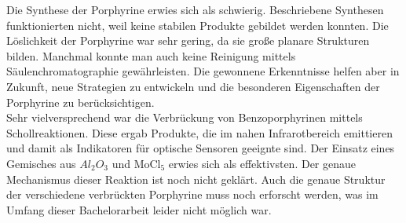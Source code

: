 Die Synthese der Porphyrine erwies sich als schwierig. Beschriebene Synthesen funktionierten nicht, weil keine stabilen Produkte gebildet werden konnten. Die Löslichkeit der Porphyrine war sehr gering, da sie große planare Strukturen bilden. Manchmal konnte man auch keine Reinigung mittels Säulenchromatographie gewährleisten.
Die gewonnene Erkenntnisse helfen aber in Zukunft, neue Strategien zu entwickeln und die besonderen Eigenschaften der Porphyrine zu berücksichtigen.
\\Sehr vielversprechend war die Verbrückung von Benzoporphyrinen mittels Schollreaktionen. Diese ergab Produkte, die im nahen Infrarotbereich emittieren und damit als Indikatoren für optische Sensoren geeignte sind. Der Einsatz eines Gemisches aus $Al_2O_3$ und MoCl$_5$ erwies sich als effektivsten. Der genaue Mechanismus dieser Reaktion ist noch nicht geklärt. Auch die genaue Struktur der verschiedene verbrückten Porphyrine muss noch erforscht werden, was im Umfang dieser Bachelorarbeit leider nicht möglich war. 